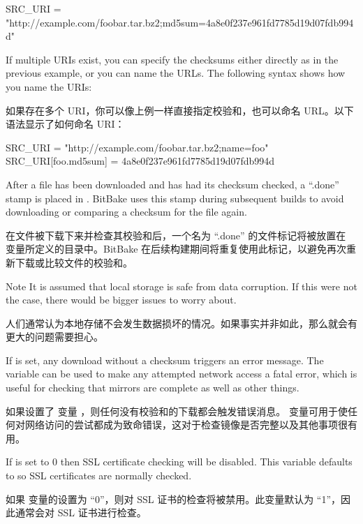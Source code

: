 \begin{pyglist}
SRC_URI = "http://example.com/foobar.tar.bz2;md5sum=4a8e0f237e961fd7785d19d07fdb994d"
\end{pyglist}

If multiple URIs exist, you can specify the checksums either directly as in the previous example, or you can name the URLs. The following syntax shows how you name the URIs:

如果存在多个 URI，你可以像上例一样直接指定校验和，也可以命名 URL。以下语法显示了如何命名 URI：

\begin{pyglist}
SRC_URI = "http://example.com/foobar.tar.bz2;name=foo"
SRC_URI[foo.md5sum] = 4a8e0f237e961fd7785d19d07fdb994d
\end{pyglist}


After a file has been downloaded and has had its checksum checked, a ``.done'' stamp is placed in . BitBake uses this stamp during subsequent builds to avoid downloading or comparing a checksum for the file again.

在文件被下载下来并检查其校验和后，一个名为 ``.done'' 的文件标记将被放置在  变量所定义的目录中。BitBake 在后续构建期间将重复使用此标记，以避免再次重新下载或比较文件的校验和。

\medskip
\begin{noteblock}{Note}%
It is assumed that local storage is safe from data corruption. If this were not the case, there would be bigger issues to worry about.

\medskip
人们通常认为本地存储不会发生数据损坏的情况。如果事实并非如此，那么就会有更大的问题需要担心。
\end{noteblock}

If  is set, any download without a checksum triggers an error message. The  variable can be used to make any attempted network access a fatal error, which is useful for checking that mirrors are complete as well as other things.

如果设置了  变量 ，则任何没有校验和的下载都会触发错误消息。 变量可用于使任何对网络访问的尝试都成为致命错误，这对于检查镜像是否完整以及其他事项很有用。

If  is set to 0 then SSL certificate checking will be disabled. This variable defaults to  so SSL certificates are normally checked.

如果  变量的设置为 ``0''，则对 SSL 证书的检查将被禁用。此变量默认为 ``1''，因此通常会对 SSL 证书进行检查。


